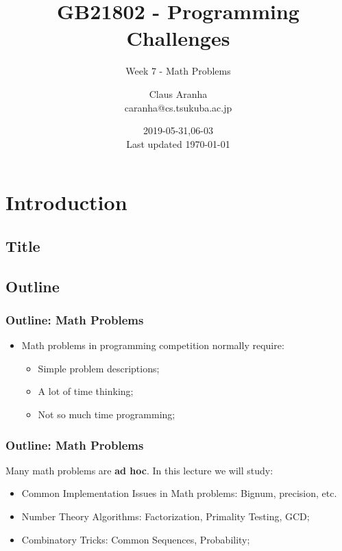 \documentclass{beamer}
\title[GB21802]{GB21802 - Programming Challenges}
\subtitle[]{Week 7 - Math Problems}
\author[Claus Aranha]{Claus Aranha\\{\footnotesize caranha@cs.tsukuba.ac.jp}}
\institute{College of Information Science}
\date{2019-05-31,06-03\\{\tiny Last updated \today}}
\begin{document}
\section{Introduction}
\subsection{Title}
\begin{frame}
\maketitle
\end{frame}

%
% 

\subsection{Outline}
\begin{frame}
  \frametitle{Outline: Math Problems}

  \begin{itemize}
    \item Math problems in programming competition normally require:
    \begin{itemize}
      \item Simple problem descriptions;
      \item A lot of time thinking;
      \item Not so much time programming;
    \end{itemize}
  \end{itemize}
\end{frame}

\begin{frame}
  \frametitle{Outline: Math Problems}

  Many math problems are {\bf ad hoc}. In this lecture we will study:
  \begin{itemize}
    \item Common Implementation Issues in Math problems: Bignum, precision, etc.
    \item Number Theory Algorithms: Factorization, Primality Testing, GCD;
    \item Combinatory Tricks: Common Sequences, Probability;
  \end{itemize}
\end{frame}
\end{document}
